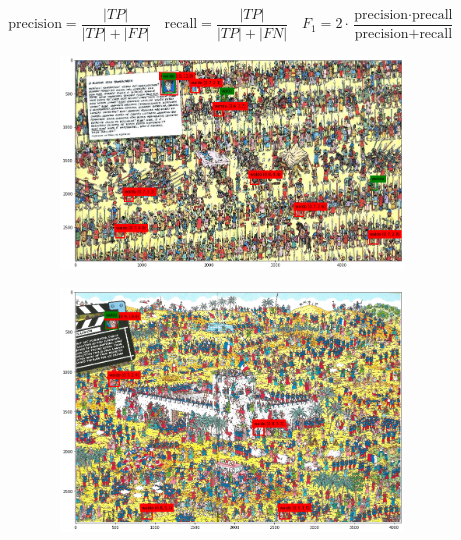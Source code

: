 \documentclass[11pt]{article}
\begin{document}
\begin{equation*}
    \text{precision} = \frac{|TP|}{|TP| + |FP|}  
    \quad
    \text{recall} = \frac{|TP|}{|TP| + |FN|}
    \quad
    F_1 = 2\cdot \frac{\text{precision} \cdot \text{precall}}{\text{precision} + \text{recall}}
\end{equation*}


\begin{figure}[]
    \centering
    \begin{subfigure}{0.3\linewidth}
    \includegraphics[width =\linewidth]{figures/detections_1}
    \end{subfigure}
    \begin{subfigure}{0.3\linewidth}
    \includegraphics[width =\linewidth]{figures/detections_3}
    \end{subfigure}
    \begin{subfigure}{0.3\linewidth}

\end{subfigure}
\end{figure}
\end{document}
